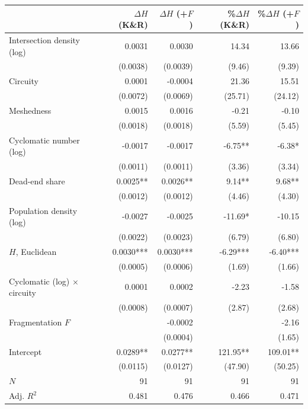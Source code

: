 \begin{tabular}{lrrrr}
\toprule
 & $\Delta H$ (K\&R) & $\Delta H$ (+$F$) & \%$\Delta H$ (K\&R) & \%$\Delta H$ (+$F$) \\
\midrule
Intersection density (log) & 0.0031 & 0.0030 & 14.34 & 13.66 \\
 & (0.0038) & (0.0039) & (9.46) & (9.39) \\
Circuity & 0.0001 & -0.0004 & 21.36 & 15.51 \\
 & (0.0072) & (0.0069) & (25.71) & (24.12) \\
Meshedness & 0.0015 & 0.0016 & -0.21 & -0.10 \\
 & (0.0018) & (0.0018) & (5.59) & (5.45) \\
Cyclomatic number (log) & -0.0017 & -0.0017 & -6.75** & -6.38* \\
 & (0.0011) & (0.0011) & (3.36) & (3.34) \\
Dead-end share & 0.0025** & 0.0026** & 9.14** & 9.68** \\
 & (0.0012) & (0.0012) & (4.46) & (4.30) \\
Population density (log) & -0.0027 & -0.0025 & -11.69* & -10.15 \\
 & (0.0022) & (0.0023) & (6.79) & (6.80) \\
$H$, Euclidean & 0.0030*** & 0.0030*** & -6.29*** & -6.40*** \\
 & (0.0005) & (0.0006) & (1.69) & (1.66) \\
Cyclomatic (log) $\times$ circuity & 0.0001 & 0.0002 & -2.23 & -1.58 \\
 & (0.0008) & (0.0007) & (2.87) & (2.68) \\
Fragmentation $F$ &  & -0.0002 &  & -2.16 \\
 &  & (0.0004) &  & (1.65) \\
Intercept & 0.0289** & 0.0277** & 121.95** & 109.01** \\
 & (0.0115) & (0.0127) & (47.90) & (50.25) \\
\midrule
$N$ & 91 & 91 & 91 & 91 \\
Adj. $R^2$ & 0.481 & 0.476 & 0.466 & 0.471 \\
\bottomrule
\end{tabular}
